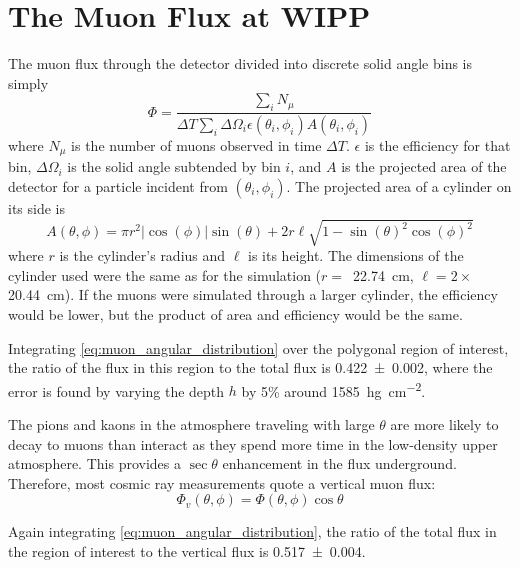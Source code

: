 \documentclass[herrin-thesis.tex]{subfiles}
\begin{document}
\section{The Muon Flux at WIPP}
\label{sec:muon:wipp}
The muon flux through the detector divided into discrete solid angle bins is simply
\begin{equation}
\label{eq:muon_fluxdef}
\Phi = \frac{\sum_{i}N_{\mu}}{ \Delta T\sum_{i}\Delta\Omega_i \epsilon(\theta_i, \phi_i) A(\theta_i, \phi_i)}
\end{equation}
where \(N_\mu\) is the number of muons observed in time \(\Delta T\). \(\epsilon\) is the efficiency for that bin, \(\Delta\Omega_i\) is the solid angle subtended by bin \(i\), and \(A\) is the projected area of the detector for a particle incident from \((\theta_i, \phi_i)\). The projected area of a cylinder on its side is
\begin{equation}
A(\theta,\phi) = \pi r^2 |\cos(\phi)|\sin(\theta) + 2 r \ell \sqrt{1-\sin(\theta)^2 \cos(\phi)^2}
\end{equation}
where \(r\) is the cylinder's radius and \(\ell\) is its height. The dimensions of the cylinder used were the same as for the simulation (\(r =\)~\SI{22.74}{\cm}, \(\ell=2\times\)\SI{20.44}{\cm}). If the muons were simulated through a larger cylinder, the efficiency would be lower, but the product of area and efficiency would be the same.

Integrating \cref{eq:muon_angular_distribution} over the polygonal region of interest, the ratio of the flux in this region to the total flux is \num{0.422\pm0.002}, where the error is found by varying the depth \(h\) by 5\% around \SI{1585}{\hecto\g\per\square\cm}.

The pions and kaons in the atmosphere traveling with large \(\theta\) are more likely to decay to muons than interact as they spend more time in the low-density upper atmosphere. This provides a \(\sec\theta\) enhancement in the flux underground. Therefore, most cosmic ray measurements quote a vertical muon flux:
\begin{equation}
\label{eq:muon_vfluxdef}
\Phi_v(\theta, \phi) = \Phi(\theta, \phi)\cos\theta
\end{equation}

Again integrating \cref{eq:muon_angular_distribution}, the ratio of the total flux in the region of interest to the vertical flux is \num{0.517\pm0.004}.
\end{document}
